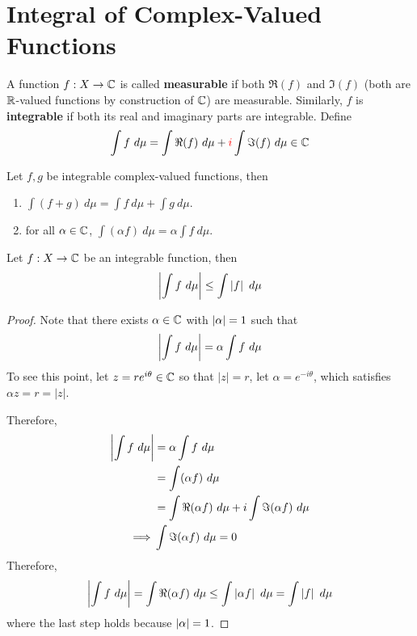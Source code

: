 \documentclass[11pt]{article}
\newcommand{\dmu}[0]{\ d\mu}
\begin{document}
	\newpage
	\section{Integral of Complex-Valued Functions}
	\begin{definition}
		A function $f: X \to \mathbb{C}$ is called \textbf{measurable} if both $\Re(f)$ and $\Im(f)$ (both are $\mathbb{R}$-valued functions by construction of $\mathbb{C}$) are measurable. Similarly, $f$ is \textbf{integrable} if both its real and imaginary parts are integrable. 
		Define
		\begin{align}
			\int f\dmu = \int \Re(f)\dmu + \red{i} \int \Im(f)\dmu \in \C
		\end{align}
	\end{definition}
	
	\begin{proposition}
		Let $f, g$ be integrable complex-valued functions, then
		\begin{enumerate}
			\item $\int (f+g)\dmu = \int f\dmu + \int g\dmu$.
			\item for all $\alpha \in \mathbb{C}$, $\int (\alpha f)\dmu = \alpha \int f\dmu$.
		\end{enumerate}
	\end{proposition}
	
	\begin{proposition}
		Let $f: X \to \mathbb{C}$ be an integrable function, then
		\begin{align}
			\abs{\int f\dmu} \leq \int \abs{f}\dmu
		\end{align}
		\begin{proof}
			Note that there exists $\alpha \in \mathbb{C}$ with $\left \vert {\alpha} \right \vert=1$ such that
			\begin{align}
				\abs{\int f\dmu} = \alpha \int f\dmu
			\end{align}
			To see this point, let $z = r e^{i \theta} \in \mathbb{C}$ so that $|z| = r$, let $\alpha = e^{-i\theta}$, which satisfies $\alpha z = r = |z|$.
			
			Therefore,
			\begin{align}
				\abs{\int f\dmu} &= \alpha \int f\dmu \\
				&= \int (\alpha f)\dmu \\
				&= \int \Re(\alpha f)\dmu + i \int \Im(\alpha f)\dmu \\
				\implies &\int \Im(\alpha f)\dmu = 0
			\end{align}
			Therefore,
			\begin{align}
				\abs{\int f\dmu} = \int \Re(\alpha f)\dmu \leq \int \abs{\alpha f}\dmu = \int \abs{f}\dmu
			\end{align}
			where the last step holds because $\left \vert {\alpha} \right \vert=1$.
		\end{proof}
	\end{proposition}
	
\end{document}
